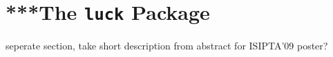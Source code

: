 

\section{***The \texttt{luck} Package} %
\label{sec:luck}

seperate section, take short description from abstract for ISIPTA'09 poster?





